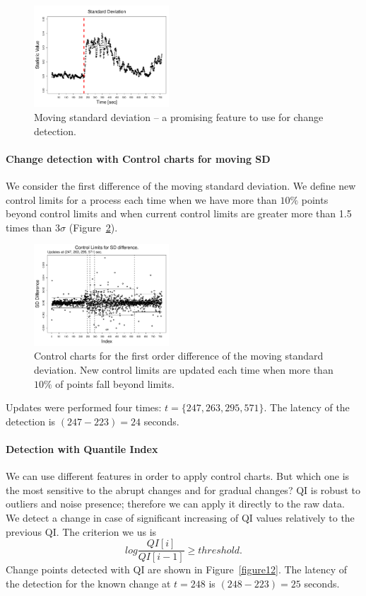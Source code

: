 \begin{figure}[htb!]
\includegraphics[width=0.45\textwidth]{pics/cfb_paper/PSD/PSDsd}
\caption{Moving standard deviation -- a promising feature to use for change detection.}\label{figure9}
\end{figure}

\paragraph{Change detection with Control charts for moving SD}
We consider the first difference of the moving standard deviation.
We define new control limits for a process each time when we have more than $10\%$ points beyond control limits and
when current control limits are greater more than 1.5 times than $3\sigma$ (Figure~\ref{figure10}).

\begin{figure}[htb!]
\includegraphics[width=0.45\textwidth]{pics/cfb_paper/PSD/PSDrunnqccSD}
\caption{Control charts for the first order difference of the moving standard deviation.
New control limits are updated each time when more than $10\%$ of points fall beyond limits.}\label{figure10}
\end{figure}

Updates were performed four times: $t=\{247, 263, 295, 571\}$. 
The latency of the detection is $(247-223)=24$ seconds.

\paragraph{Detection with Quantile Index}
We can use different features in order to apply control charts.
But which one is the most sensitive to the abrupt changes and for gradual changes?
QI is robust to outliers and noise presence; therefore we can apply it directly to the raw data.
We detect a change in case of significant increasing of QI values relatively to the previous QI.
The criterion we us is 
\begin{equation}\label{QIcriterion}
log \frac {QI[i]}{QI[i-1]} \geq threshold.
\end{equation}
Change points detected with QI are shown in Figure~\ref{figure12}. The latency of the detection for the known change at $t=248$ is $(248-223)=25$ seconds.

